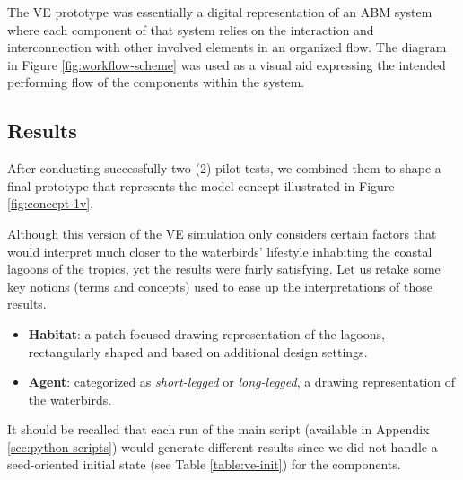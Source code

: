 The VE prototype was essentially a digital representation of an ABM system where each component of that system relies on the interaction and interconnection with other involved elements in an organized flow. The diagram in Figure \ref{fig:workflow-scheme} was used as a visual aid expressing the intended performing flow of the components within the system.

\subsection{Results}
After conducting successfully two (2) pilot tests, we combined them to shape a final prototype that represents the model concept illustrated in Figure \ref{fig:concept-1v}.

Although this version of the VE simulation only considers certain factors that would interpret much closer to the waterbirds' lifestyle inhabiting the coastal lagoons of the tropics, yet the results were fairly satisfying. Let us retake some key notions (terms and concepts) used to ease up the interpretations of those results.
\begin{itemize}
    \item \textbf{Habitat}: a patch-focused drawing representation of the lagoons, rectangularly shaped and based on additional design settings.
    \item \textbf{Agent}: categorized as \emph{short-legged} or \emph{long-legged}, a drawing representation of the waterbirds.
\end{itemize}

It should be recalled that each run of the main script (available in Appendix \ref{sec:python-scripts}) would generate different results since we did not handle a seed-oriented initial state (see Table \ref{table:ve-init}) for the components.

